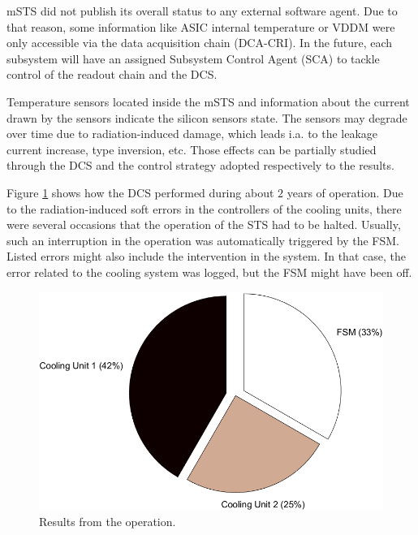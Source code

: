 \gls{mSTS} did not publish its overall status to any external software agent. Due to that reason, some information like \gls{ASIC} internal temperature or VDDM were only accessible via the data acquisition chain (\gls{DCA}-\gls{CRI}). In the future, each subsystem will have an assigned Subsystem Control Agent (\gls{SCA}) to tackle control of the readout chain and the \gls{DCS}. 


Temperature sensors located inside the \gls{mSTS} and information about the current drawn by the sensors indicate the silicon sensors state. The sensors may degrade over time due to radiation-induced damage,  which leads i.a. to the leakage current increase, type inversion, etc. Those effects can be partially studied through the \gls{DCS} and the control strategy adopted respectively to the results.

Figure \ref{fig_dcs_results} shows how the \gls{DCS} performed during about $2$ years of operation. Due to the radiation-induced soft errors in the controllers of the cooling units, there were several occasions that the operation of the \gls{STS} had to be halted. Usually, such an interruption in the operation was automatically triggered by the \gls{FSM}. Listed errors might also include the intervention in the system. In that case, the error related to the cooling system was logged, but the FSM might have been off.
\begin{figure}[!h]
\centering
\includegraphics[width=0.55\columnwidth]{Chapter6/DCS/images/DCSpie.png}
\caption{Results from the operation.}
\label{fig_dcs_results}
\end{figure}

